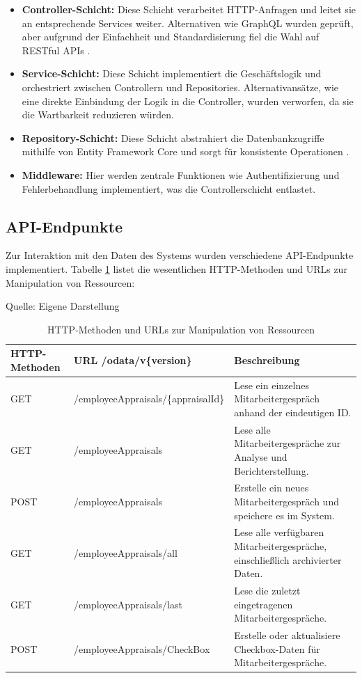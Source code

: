 \begin{itemize}
    \item \textbf{Controller-Schicht:} Diese Schicht verarbeitet HTTP-Anfragen und leitet sie an entsprechende Services weiter. Alternativen wie GraphQL wurden geprüft, aber aufgrund der Einfachheit und Standardisierung fiel die Wahl auf RESTful APIs \cite{fielding2000rest}.
    \item \textbf{Service-Schicht:} Diese Schicht implementiert die Geschäftslogik und orchestriert zwischen Controllern und Repositories. Alternativansätze, wie eine direkte Einbindung der Logik in die Controller, wurden verworfen, da sie die Wartbarkeit reduzieren würden.
    \item \textbf{Repository-Schicht:} Diese Schicht abstrahiert die Datenbankzugriffe mithilfe von Entity Framework Core und sorgt für konsistente Operationen \cite{efCoreDocs2023}.
    \item \textbf{Middleware:} Hier werden zentrale Funktionen wie Authentifizierung und Fehlerbehandlung implementiert, was die Controllerschicht entlastet.
\end{itemize}

\subsection{API-Endpunkte}
Zur Interaktion mit den Daten des Systems wurden verschiedene API-Endpunkte implementiert. Tabelle \ref{table:http-methods} listet die wesentlichen HTTP-Methoden und URLs zur Manipulation von Ressourcen:

\begin{table}[H]
\caption{HTTP-Methoden und URLs zur Manipulation von Ressourcen}
\label{table:http-methods}
\raggedright
{\scriptsize Quelle: Eigene Darstellung} \\[0.3em]
\renewcommand{\arraystretch}{1.1}
\setlength{\tabcolsep}{1.8pt}
\begin{tabularx}{\textwidth}{>{\centering\arraybackslash}m{2cm}|>{\centering\arraybackslash}m{5.5cm}|>{\raggedright\arraybackslash}m{6.5cm}}
\hline
\textbf{HTTP-Methoden} & \textbf{URL /odata/v\{version\}} & \textbf{Beschreibung} \\\hline
GET & /employeeAppraisals/\{appraisalId\} & Lese ein einzelnes Mitarbeitergespräch anhand der eindeutigen ID. \\\hline
GET & /employeeAppraisals & Lese alle Mitarbeitergespräche zur Analyse und Berichterstellung. \\\hline
POST & /employeeAppraisals & Erstelle ein neues Mitarbeitergespräch und speichere es im System. \\\hline
GET & /employeeAppraisals/all & Lese alle verfügbaren Mitarbeitergespräche, einschließlich archivierter Daten. \\\hline
GET & /employeeAppraisals/last & Lese die zuletzt eingetragenen Mitarbeitergespräche. \\\hline
POST & /employeeAppraisals/CheckBox & Erstelle oder aktualisiere Checkbox-Daten für Mitarbeitergespräche. \\\hline
\end{tabularx}
\end{table}

